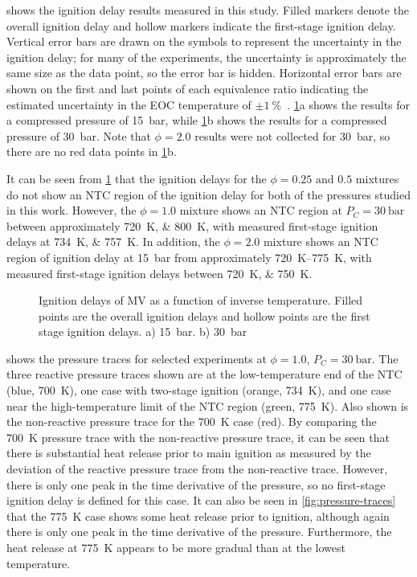 \documentclass[12pt]{../ussci}
\begin{document}
 shows the ignition delay results measured in this
study. Filled markers denote the overall ignition delay and hollow markers
indicate the first-stage ignition delay. Vertical error bars are drawn on the
symbols to represent the uncertainty in the ignition delay; for many of the
experiments, the uncertainty is approximately the same size as the data point,
so the error bar is hidden. Horizontal error bars are shown on the first and
last points of each equivalence ratio indicating the estimated uncertainty in
the EOC temperature of $\pm\SI{1}{\percent}$~\autocite{Weber2015}.
\cref{fig:ignition-delays}a shows the results for a compressed pressure of
\SI{15}{\bar}, while \cref{fig:ignition-delays}b shows the results for a
compressed pressure of \SI{30}{\bar}. Note that $\phi=2.0$ results were not
collected for \SI{30}{\bar}, so there are no red data points in
\cref{fig:ignition-delays}b.

It can be seen from \cref{fig:ignition-delays} that the ignition delays for the
\(\phi=0.25\text{ and } 0.5\) mixtures do not show an NTC region of the ignition
delay for both of the pressures studied in this work. However, the $\phi=1.0$
mixture shows an NTC region at $P_C=\SI[number-unit-product={\ }]{30}{\bar}$
between approximately \SIlist{720;800}{\K}, with measured first-stage ignition
delays at \SIlist{734;757}{\K}. In addition, the $\phi=2.0$ mixture shows an NTC
region of ignition delay at \SI{15}{\bar} from approximately
\SIrange{720}{775}{\K}, with measured first-stage ignition delays between
\SIlist{720;750}{\K}.

\begin{figure}[htb]
    \centering
    
    \caption{Ignition delays of MV as a function of inverse temperature. Filled
    points are the overall ignition delays and hollow points are the first stage
    ignition delays. a) \SI{15}{\bar}. b) \SI{30}{\bar}}
    \label{fig:ignition-delays}
\end{figure}

 shows the pressure traces for selected experiments at
\(\phi=1.0\), \(P_C =\SI[number-unit-product={\ }]{30}{\bar}\). The three
reactive pressure traces shown are at the low-temperature end of the NTC (blue,
\SI{700}{\K}), one case with two-stage ignition (orange, \SI{734}{\K}), and one
case near the high-temperature limit of the NTC region (green, \SI{775}{\K}).
Also shown is the non-reactive pressure trace for the \SI{700}{\K} case (red).
By comparing the \SI{700}{\K} pressure trace with the non-reactive pressure
trace, it can be seen that there is substantial heat release prior to main
ignition as measured by the deviation of the reactive pressure trace from the
non-reactive trace. However, there is only one peak in the time derivative of
the pressure, so no first-stage ignition delay is defined for this case. It can
also be seen in \cref{fig:pressure-traces} that the \SI{775}{\K} case shows some
heat release prior to ignition, although again there is only one peak in the
time derivative of the pressure. Furthermore, the heat release at \SI{775}{\K}
appears to be more gradual than at the lowest temperature.
\end{document}
